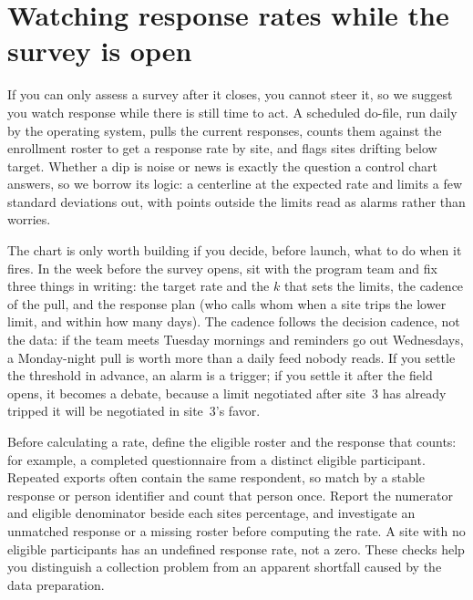 \documentclass[
    a4paper,
    fontsize=10pt,
    twoside=true,
    numbers=noenddot,
]{kaobook}
\begin{document}
\section{Watching response rates while the survey is open}\label{sec:monitor}
If you can only assess a survey after it closes, you cannot steer it, so we suggest you watch response while there is still time to act. A scheduled do-file, run daily by the operating system, pulls the current responses, counts them against the enrollment roster to get a response rate by site, and flags sites drifting below target. Whether a dip is noise or news is exactly the question a control chart answers, so we borrow its logic: a centerline at the expected rate and limits a few standard deviations out, with points outside the limits read as alarms rather than worries.

The chart is only worth building if you decide, before launch, what to do when it fires. In the week before the survey opens, sit with the program team and fix three things in writing: the target rate and the $k$ that sets the limits, the cadence of the pull, and the response plan (who calls whom when a site trips the lower limit, and within how many days). The cadence follows the decision cadence, not the data: if the team meets Tuesday mornings and reminders go out Wednesdays, a Monday-night pull is worth more than a daily feed nobody reads. If you settle the threshold in advance, an alarm is a trigger; if you settle it after the field opens, it becomes a debate, because a limit negotiated after site~3 has already tripped it will be negotiated in site~3's favor.

Before calculating a rate, define the eligible roster and the response that counts: for example, a completed questionnaire from a distinct eligible participant. Repeated exports often contain the same respondent, so match by a stable response or person identifier and count that person once. Report the numerator and eligible denominator beside each site\textquotesingle s percentage, and investigate an unmatched response or a missing roster before computing the rate. A site with no eligible participants has an undefined response rate, not a zero. These checks help you distinguish a collection problem from an apparent shortfall caused by the data preparation.
\end{document}
